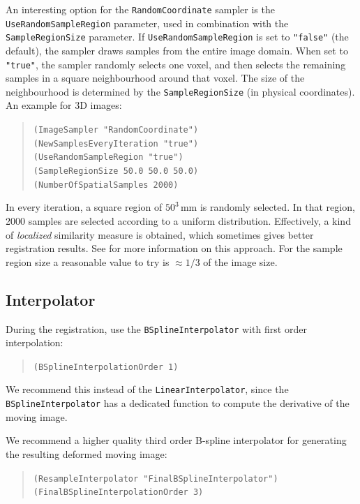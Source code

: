 \documentclass[]{report}
\begin{document}
An interesting option for the \texttt{RandomCoordinate} sampler is
the \texttt{UseRandomSampleRegion} parameter, used in combination
with the \texttt{SampleRegionSize} parameter. If
\texttt{UseRandomSampleRegion} is set to \texttt{"false"} (the
default), the sampler draws samples from the entire image domain.
When set to \texttt{"true"}, the sampler randomly selects one
voxel, and then selects the remaining samples in a square
neighbourhood around that voxel. The size of the neighbourhood is
determined by the \texttt{SampleRegionSize} (in physical
coordinates). An example for 3D images:
\begin{quote}
  \texttt{(ImageSampler "RandomCoordinate")}\\
  \texttt{(NewSamplesEveryIteration "true")}\\
  \texttt{(UseRandomSampleRegion "true")}\\
  \texttt{(SampleRegionSize 50.0 50.0 50.0)}\\
  \texttt{(NumberOfSpatialSamples 2000)}\\
\end{quote}
In every iteration, a square region of $50^3$\,mm is randomly
selected. In that region, 2000 samples are selected according to a
uniform distribution. Effectively, a kind of \emph{localized}
similarity measure is obtained, which sometimes gives better
registration results. See \cite{Kle08:Automatic} for more
information on this approach. For the sample region size a
reasonable value to try is $\approx1/3$ of the image size.

\subsection{Interpolator}\label{sec:interpolatortuning}

During the registration, use the \texttt{BSplineInterpolator} with
first order interpolation:
\begin{quote}
\texttt{(BSplineInterpolationOrder 1)}
\end{quote}
We recommend this instead of the \texttt{LinearInterpolator},
since the \texttt{BSplineInterpolator} has a dedicated function to
compute the derivative of the moving image.

We recommend a higher quality third order B-spline interpolator for
generating the resulting deformed moving image:
\begin{quote}
\texttt{(ResampleInterpolator "FinalBSplineInterpolator")} \\
\texttt{(FinalBSplineInterpolationOrder 3)}
\end{quote}
\end{document}
